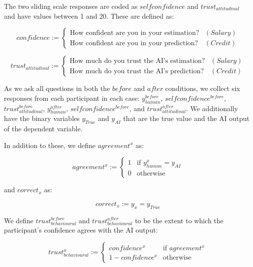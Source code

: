 \noindent The two sliding scale responses are coded as $selfconfidence$ and $trust_{attitudinal}$ and have values between 1 and 20. These are defined as:

\begin{equation}
    confidence := \begin{cases}
        \text{How confident are you in your estimation?} & (Salary) \\
        \text{How confident are you in your prediction?} & (Credit)
    \end{cases}
\end{equation}

\begin{equation}
    trust_{attitudinal} := \begin{cases}
        \text{How much do you trust the AI's estimation?} & (Salary) \\
        \text{How much do you trust the AI's prediction?} & (Credit)
    \end{cases}
\end{equation}

As we ask all questions in both the $before$ and $after$ conditions, we collect six responses from each participant in each case: $y_{human}^{before}$, $selfconfidence^{before}$, $trust_{attitudinal}^{before}$, $y_{human}^{after}$, $selfconfidence^{before}$, and $trust_{attitudinal}^{after}$.  We additionally have the binary variables $y_{True}$ and $y_{AI}$ that are the true value and the AI output of the dependent variable.

In addition to these, we define $agreement^{x}$ as:

\begin{equation}
    agreement^{x} := \begin{cases}
        1 & \text{if } y_{human}^{x} = y_{AI} \\
        0 & \text{otherwise}
    \end{cases}
\end{equation}

\noindent and $correct_{x}$ as:

\begin{equation}
    correct_{x} := y_{x} = y_{True}
\end{equation}

We define $trust_{behavioural}^{before}$ and $trust_{behavioural}^{after}$ to be the extent to which the participant's confidence agrees with the AI output:

\begin{equation}
    trust_{behavioural}^{x} := \begin{cases}
        confidence^{x}      & \text{if } agreement^{x} \\
        1-confidence^{x}    & \text{otherwise}
    \end{cases}
\end{equation}

